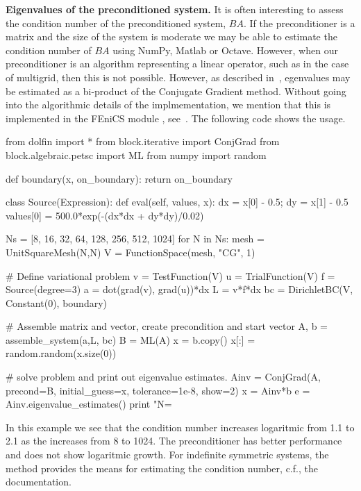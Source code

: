 \begin{example}{\textbf{Eigenvalues of the preconditioned system.}}
It is often interesting to assess the condition number of the 
preconditioned system, $BA$. If the preconditioner is a matrix and the
size of the system is moderate we may be able to estimate the condition
number of $BA$ using NumPy, Matlab or Octave. However, when our preconditioner
is an algorithm representing a linear operator, such as in the case
of multigrid, then this is not possible. However, as described in~\cite{saad2003iterative}, 
egenvalues may be estimated as a bi-product of the Conjugate Gradient method. Without
going into the algorithmic details of the implmementation, we mention that
this is implemented in the FEniCS module , see~\cite{mardal2012block}.      
The following code shows the usage.  
\begin{python}
from dolfin import *
from block.iterative import ConjGrad
from block.algebraic.petsc import ML
from numpy import random

def boundary(x, on_boundary):
    return on_boundary

class Source(Expression):
    def eval(self, values, x):
        dx = x[0] - 0.5; dy = x[1] - 0.5
        values[0] = 500.0*exp(-(dx*dx + dy*dy)/0.02)

Ns = [8, 16, 32, 64, 128, 256, 512, 1024]
for N in Ns: 
    mesh = UnitSquareMesh(N,N)
    V = FunctionSpace(mesh, "CG", 1)

    # Define variational problem
    v = TestFunction(V)
    u = TrialFunction(V)
    f = Source(degree=3)
    a = dot(grad(v), grad(u))*dx
    L = v*f*dx 
    bc = DirichletBC(V, Constant(0), boundary)

    # Assemble matrix and vector, create precondition and start vector 
    A, b = assemble_system(a,L, bc)
    B = ML(A)
    x = b.copy()
    x[:] = random.random(x.size(0))

    # solve problem and print out eigenvalue estimates. 
    Ainv = ConjGrad(A, precond=B, initial_guess=x, tolerance=1e-8, show=2)
    x = Ainv*b
    e = Ainv.eigenvalue_estimates()
    print "N=%
\end{python}
In this example we see that the condition number increases logaritmic from 1.1 to 2.1 as the 
increases from 8 to 1024. The  preconditioner has better performance and does
not show logaritmic growth. For indefinite symmetric systems, the  method provides
the means for estimating the condition number, c.f., the  documentation.    
\end{example}

